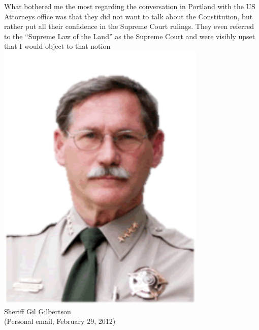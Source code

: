 
\begin{frame}
    \begin{columns}[onlytextwidth]
What bothered me the most regarding the conversation in Portland with the US
Attorneys office was that they did not want to talk about the Constitution,
but rather put all their confidence in the Supreme Court rulings. They even
referred to the ``Supreme Law of the Land'' as the Supreme Court and were visibly
upset that I would object to that notion
            \centering
            \includegraphics[width=0.75\textwidth]{img/gil-gilbertson.png}
            \\ Sheriff Gil Gilbertson
            \\ (Personal email, February 29, 2012)
    \end{columns}
\end{frame}

